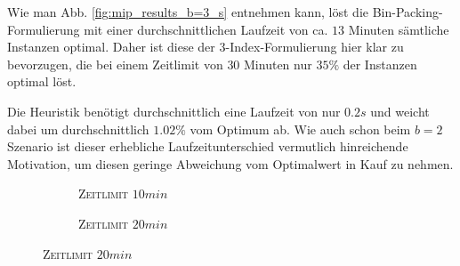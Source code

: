 Wie man Abb. \ref{fig:mip_results_b=3_s} entnehmen kann, löst die Bin-Packing-Formulierung mit einer durchschnittlichen
Laufzeit von ca. $13$ Minuten sämtliche Instanzen optimal. Daher ist diese der 3-Index-Formulierung hier klar zu bevorzugen, die bei
einem Zeitlimit von $30$ Minuten nur $35 \%$ der Instanzen optimal löst.

Die Heuristik benötigt durchschnittlich eine Laufzeit von nur $0.2s$ und weicht dabei um durchschnittlich
$1.02 \%$ vom Optimum ab. Wie auch schon beim $b = 2$ Szenario ist dieser erhebliche Laufzeitunterschied
vermutlich hinreichende Motivation, um diesen geringe Abweichung vom Optimalwert in Kauf zu nehmen.

\begin{figure}[H]
\begin{subfigure}[b]{0.3\textwidth}
\centering
{}
\caption{\textsc{Zeitlimit} $10min$}
\label{}
\end{subfigure}
\begin{subfigure}[b]{0.3\textwidth}
\centering
{}
\caption{\textsc{Zeitlimit} $20min$}
\label{}
\end{subfigure}

\end{figure}
